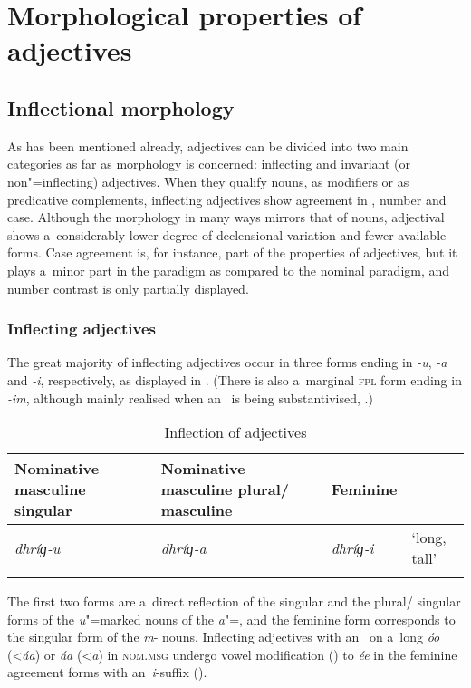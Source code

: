 \section{Morphological properties of adjectives}
\label{sec:6-3}

\subsection{Inflectional morphology}
\label{subsec:6-3-1}

As has been mentioned already, adjectives can be divided into two main categories as far as morphology is concerned: inflecting and invariant (or non"=inflecting) adjectives. When they qualify nouns, as modifiers or as predicative complements, inflecting adjectives show agreement in , number and case. Although the  morphology in many ways mirrors that of nouns, adjectival  shows a~considerably lower degree of declensional variation and fewer available forms. Case agreement is, for instance, part of the  properties of adjectives, but it plays a~minor part in the paradigm as compared to the nominal paradigm, and number contrast is only partially displayed.

\subsubsection*{Inflecting adjectives}

The great majority of inflecting adjectives occur in three forms ending in \textit{-u}, \textit{-a} and \textit{-i}, respectively, as displayed in . (There is also a~marginal \textsc{fpl} form ending in \textit{-im}, although mainly realised when an~ is being substantivised, .)


\begin{table}[p]
\caption{Inflection of adjectives}
\begin{tabularx}{\textwidth}{ Q Q l l }
\lsptoprule
Nominative masculine singular &
Nominative masculine plural/ masculine &
Feminine &
\\\hline
\textit{dhríɡ-u} &
\textit{dhríɡ-a} &
\textit{dhríɡ-i} &
`long, tall'\\\lspbottomrule
\end{tabularx}
\label{tab:6-2}
\end{table}


The first two forms are a~direct reflection of the  singular and the  plural/ singular forms of the \textit{u}"=marked nouns of the \textit{a}"=, and the feminine form corresponds to the singular form of the \textit{m}- nouns. Inflecting adjectives with an~ on a~long \textit{óo} ({\textless}\textit{áa}) or \textit{áa} ({\textless}\textit{a}) in \textsc{nom.msg} undergo vowel modification () to \textit{ée} in the feminine agreement forms with an~\textit{i}-suffix ().


